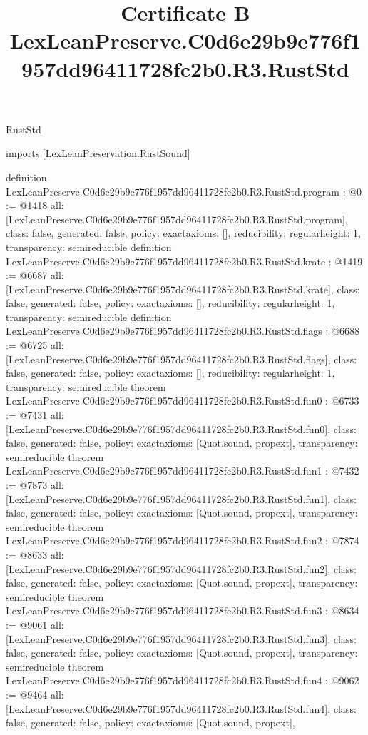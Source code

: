\begin{lexlean}{RustStd}
\title{Certificate B LexLeanPreserve.C0d6e29b9e776f1957dd96411728fc2b0.R3.RustStd}
\begin{coremodule}
imports [LexLeanPreservation.RustSound]

definition LexLeanPreserve.C0d6e29b9e776f1957dd96411728fc2b0.R3.RustStd.program : @0 := @1418 {
  all: [LexLeanPreserve.C0d6e29b9e776f1957dd96411728fc2b0.R3.RustStd.program],
  class: false,
  generated: false,
  policy: exact{axioms: []},
  reducibility: regular{height: 1},
  transparency: semireducible
}
definition LexLeanPreserve.C0d6e29b9e776f1957dd96411728fc2b0.R3.RustStd.krate : @1419 := @6687 {
  all: [LexLeanPreserve.C0d6e29b9e776f1957dd96411728fc2b0.R3.RustStd.krate],
  class: false,
  generated: false,
  policy: exact{axioms: []},
  reducibility: regular{height: 1},
  transparency: semireducible
}
definition LexLeanPreserve.C0d6e29b9e776f1957dd96411728fc2b0.R3.RustStd.flags : @6688 := @6725 {
  all: [LexLeanPreserve.C0d6e29b9e776f1957dd96411728fc2b0.R3.RustStd.flags],
  class: false,
  generated: false,
  policy: exact{axioms: []},
  reducibility: regular{height: 1},
  transparency: semireducible
}
theorem LexLeanPreserve.C0d6e29b9e776f1957dd96411728fc2b0.R3.RustStd.fun0 : @6733 := @7431 {
  all: [LexLeanPreserve.C0d6e29b9e776f1957dd96411728fc2b0.R3.RustStd.fun0],
  class: false,
  generated: false,
  policy: exact{axioms: [Quot.sound, propext]},
  transparency: semireducible
}
theorem LexLeanPreserve.C0d6e29b9e776f1957dd96411728fc2b0.R3.RustStd.fun1 : @7432 := @7873 {
  all: [LexLeanPreserve.C0d6e29b9e776f1957dd96411728fc2b0.R3.RustStd.fun1],
  class: false,
  generated: false,
  policy: exact{axioms: [Quot.sound, propext]},
  transparency: semireducible
}
theorem LexLeanPreserve.C0d6e29b9e776f1957dd96411728fc2b0.R3.RustStd.fun2 : @7874 := @8633 {
  all: [LexLeanPreserve.C0d6e29b9e776f1957dd96411728fc2b0.R3.RustStd.fun2],
  class: false,
  generated: false,
  policy: exact{axioms: [Quot.sound, propext]},
  transparency: semireducible
}
theorem LexLeanPreserve.C0d6e29b9e776f1957dd96411728fc2b0.R3.RustStd.fun3 : @8634 := @9061 {
  all: [LexLeanPreserve.C0d6e29b9e776f1957dd96411728fc2b0.R3.RustStd.fun3],
  class: false,
  generated: false,
  policy: exact{axioms: [Quot.sound, propext]},
  transparency: semireducible
}
theorem LexLeanPreserve.C0d6e29b9e776f1957dd96411728fc2b0.R3.RustStd.fun4 : @9062 := @9464 {
  all: [LexLeanPreserve.C0d6e29b9e776f1957dd96411728fc2b0.R3.RustStd.fun4],
  class: false,
  generated: false,
  policy: exact{axioms: [Quot.sound, propext]},
}
\end{coremodule}
\end{lexlean}
